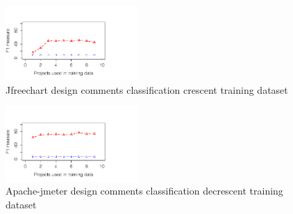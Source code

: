 \begin{figure}[thb!]
	\label{fig:jfreechart_design_crescent}
	\vspace{-3mm}
	\includegraphics[width=0.45\textwidth]{figures/jfreechart_design_crescent}
	\caption{Jfreechart design comments classification crescent training dataset}
\end{figure}

\begin{figure}[thb!]
	\label{fig:jfreechart_design_decrescent}
	\vspace{-13mm}
	\includegraphics[width=0.45\textwidth]{figures/jmeter_design_decrescent}
	\caption{Apache-jmeter design comments classification decrescent training dataset}
\end{figure}